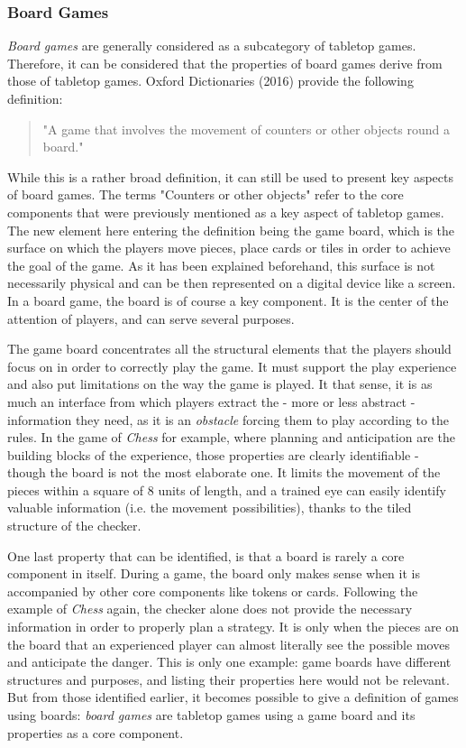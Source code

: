 \subsubsection{Board Games}
\textit{Board games} are generally considered as a subcategory of tabletop games. Therefore, it can be considered that the properties of board games derive from those of tabletop games. Oxford Dictionaries (2016)\cite{web:oxford} provide the following definition:
\begin{quotation}
"A game that involves the movement of counters or other objects round a board."
\end{quotation}
While this is a rather broad definition, it can still be used to present key aspects of board games. The terms "Counters or other objects" refer to the core components that were previously mentioned as a key aspect of tabletop games. The new element here entering the definition being the game board, which is the surface on which the players move pieces, place cards or tiles in order to achieve the goal of the game. As it has been explained beforehand, this surface is not necessarily physical and can be then represented on a digital device like a screen. In a board game, the board is of course a key component. It is the center of the attention of players, and can serve several purposes.

The game board concentrates all the structural elements that the players should focus on in order to correctly play the game. It must support the play experience and also put limitations on the way the game is played. It that sense, it is as much an interface from which players extract the - more or less abstract - information they need, as it is an \textit{obstacle} forcing them to play according to the rules. In the game of \textit{Chess} for example, where planning and anticipation are the building blocks of the experience, those properties are clearly identifiable - though the board is not the most elaborate one. It limits the movement of the pieces within a square of 8 units of length, and a trained eye can easily identify valuable information (i.e. the movement possibilities), thanks to the tiled structure of the checker. 

One last property that can be identified, is that a board is rarely a core component in itself. During a game, the board only makes sense when it is accompanied by other core components like tokens or cards. Following the example of  \textit{Chess} again, the checker alone does not provide the necessary information in order to properly plan a strategy. It is only when the pieces are on the board that an experienced player can almost literally see the possible moves and anticipate the danger. This is only one example: game boards have different structures and purposes, and listing their properties here would not be relevant. But from those identified earlier, it becomes possible to give a definition of games using boards: \textit{board games} are tabletop games using a game board and its properties as a core component.
